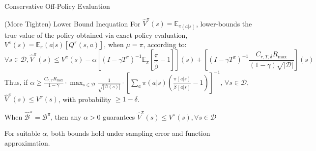 \documentclass[11pt]{beamer}
\newcommand{\mbb}[1]{\mathbb{#1}}
\newcommand{\mc}[1]{\mathcal{#1}}
\newcommand{\abs}[1]{\left\lvert #1 \right\rvert}
\newcommand{\supp}{\operatorname{supp}}
\begin{document}
\begin{frame}{Conservative Off-Policy Evaluation}

  \begin{block}{(More Tighten) Lower Bound Inequation}
    For $\hat{V}^{\pi}(s) = \mbb{E}_{\pi(a|s)}$, lower-bounds the true value of the policy obtained via exact policy evaluation, $V^\pi(s) = \mbb{E}_{\pi}(a|s) [Q^\pi(s,a)]$, when $\mu=\pi$, according to:
    \[
      \forall s \in \mc{D}, \hat{V}^\pi (s) \leq V^\pi (s) - \alpha \left[(I - \gamma T^\pi)^{-1} \mbb{E}_\pi  \left[\frac{\pi}{\hat{\beta}} - 1\right]\right] (s) + \left[(I - \gamma T^\pi)^{-1} \frac{C_{r, T, \delta}R_{\text{max}}}{(1-\gamma)\sqrt{\abs{\mc{D}}}}\right](s)
    \]
    Thus, if $\alpha \geq \frac{C_{r,T}R_{\text{max}}}{1-\gamma} \cdot \max_{s\in \mc{D}}\frac{1}{\sqrt{\abs{\mc{D}(s)}}}\cdot \left[\sum_a \pi(a|s) (\frac{\pi(a|s)}{\hat{\beta}(a|s)}-1)\right]^{-1}$, $\forall s \in \mc{D}$, $\hat{V}^{\pi}(s) \leq V^\pi (s)$, with probability $\geq 1 - \delta$.

    When $\hat{\mc{B}}^\pi = \mc{B}^\pi$, then any $\alpha >0$ guarantees $\hat{V}^\pi (s) \leq V^{\pi} (s), \forall s \in \mc{D}$
  \end{block}
  For suitable $\alpha$, both bounds hold under sampling error and function approximation.
\end{frame}
\end{document}
